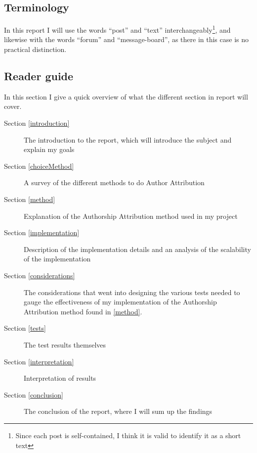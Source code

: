 \subsection{Terminology}
In this report I will use the words ``post'' and ``text'' interchangeably\footnote{Since each post is self-contained, I think it is valid to identify it as a short text}, and likewise with the words ``forum'' and ``message-board'', as there in this case is no practical distinction. 

\subsection{Reader guide}
In this section I give a quick overview of what the different section in report will cover.
\begin{description}
\item[Section \ref{introduction}] The introduction to the report, which will introduce the subject and explain my goals
\item[Section \ref{choiceMethod}] A survey of the different methods to do Author Attribution  
\item[Section \ref{method}] Explanation of the Authorship Attribution method used in my project
\item[Section \ref{implementation}] Description of the implementation details and an analysis of the scalability of the implementation
\item[Section \ref{considerations}] The considerations that went into designing the various tests needed to gauge the effectiveness of my implementation of the Authorship Attribution method found in \ref{method}.
\item[Section \ref{tests}] The test results themselves
\item[Section \ref{interpretation}] Interpretation of results
\item[Section \ref{conclusion}] The conclusion of the report, where I will sum up the findings  
\end{description}
